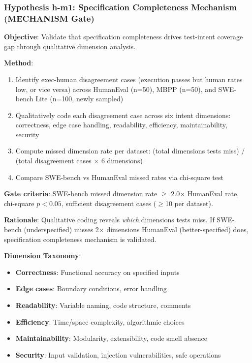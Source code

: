 \subsubsection{Hypothesis h-m1: Specification Completeness Mechanism (MECHANISM Gate)}

\textbf{Objective}: Validate that specification completeness drives test-intent coverage gap through qualitative dimension analysis.

\textbf{Method}:
\begin{enumerate}
\item Identify exec-human disagreement cases (execution passes but human rates low, or vice versa) across HumanEval (n=50), MBPP (n=50), and SWE-bench Lite (n=100, newly sampled)
\item Qualitatively code each disagreement case across six intent dimensions: correctness, edge case handling, readability, efficiency, maintainability, security
\item Compute missed dimension rate per dataset: (total dimensions tests miss) / (total disagreement cases $\times$ 6 dimensions)
\item Compare SWE-bench vs HumanEval missed rates via chi-square test
\end{enumerate}

\textbf{Gate criteria}: SWE-bench missed dimension rate $\geq$ 2.0$\times$ HumanEval rate, chi-square $p<0.05$, sufficient disagreement cases ($\geq$10 per dataset).

\textbf{Rationale}: Qualitative coding reveals \emph{which} dimensions tests miss. If SWE-bench (underspecified) misses 2$\times$ dimensions HumanEval (better-specified) does, specification completeness mechanism is validated.

\textbf{Dimension Taxonomy}:
\begin{itemize}
\item \textbf{Correctness}: Functional accuracy on specified inputs
\item \textbf{Edge cases}: Boundary conditions, error handling
\item \textbf{Readability}: Variable naming, code structure, comments
\item \textbf{Efficiency}: Time/space complexity, algorithmic choices
\item \textbf{Maintainability}: Modularity, extensibility, code smell absence
\item \textbf{Security}: Input validation, injection vulnerabilities, safe operations
\end{itemize}

